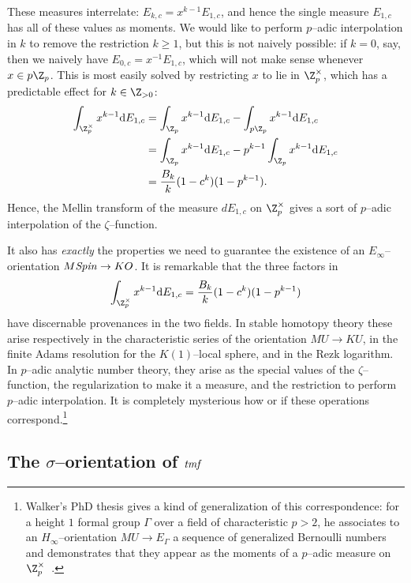 These measures interrelate: \(E_{k, c} = x^{k-1} E_{1, c}\), and hence the single measure \(E_{1, c}\) has all of these values as moments.  We would like to perform \(p\)--adic interpolation in \(k\) to remove the restriction \(k \ge 1\), but this is not naively possible: if \(k = 0\), say, then we naively have \(E_{0, c} = x^{-1} E_{1, c}\), which will not make sense whenever \(x \in p\Z_p\).  This is most easily solved by restricting \(x\) to lie in \(\Z_p^\times\), which has a predictable effect for \(k \in \Z_{> 0}\):
\begin{align*}
\int_{\Z_p^\times} x^{k-1} \mathrm dE_{1,c} & = \int_{\Z_p} x^{k-1} \mathrm dE_{1,c} - \int_{p\Z_p} x^{k-1} \mathrm dE_{1, c} \\
& = \int_{\Z_p} x^{k-1} \mathrm dE_{1,c} - p^{k-1} \int_{\Z_p} x^{k-1} \mathrm dE_{1, c} \\
& = \frac{B_k}{k}(1 - c^k)(1 - p^{k-1}).
\end{align*}
Hence, the Mellin transform of the measure \(dE_{1,c}\) on \(\Z_p^\times\) gives a sort of \(p\)--adic interpolation of the \(\zeta\)--function.

It also has \emph{exactly} the properties we need to guarantee the existence of an \(E_\infty\)--orientation \(M\mathit{Spin} \to KO\).  It is remarkable that the three factors in \[\int_{\Z_p^\times} x^{k-1} \mathrm d E_{1, c} = \frac{B_k}{k} (1 - c^k)(1 - p^{k-1})\] have discernable provenances in the two fields.  In stable homotopy theory these arise respectively in the characteristic series of the orientation \(MU \to KU\), in the finite Adams resolution for the \(K(1)\)--local sphere, and in the Rezk logarithm.  In \(p\)--adic analytic number theory, they arise as the special values of the \(\zeta\)--function, the regularization to make it a measure, and the restriction to perform \(p\)--adic interpolation.  It is completely mysterious how or if these operations correspond.\footnote{Walker's PhD thesis gives a kind of generalization of this correspondence: for a height \(1\) formal group \(\Gamma\) over a field of characteristic \(p > 2\), he associates to an \(H_\infty\)--orientation \(MU \to E_\Gamma\) a sequence of generalized Bernoulli numbers and demonstrates that they appear as the moments of a \(p\)--adic measure on \(\Z_p^\times\)~\cite{Walker}.}




\subsection{The \(\sigma\)--orientation of \(\mathit{tmf}\)}

